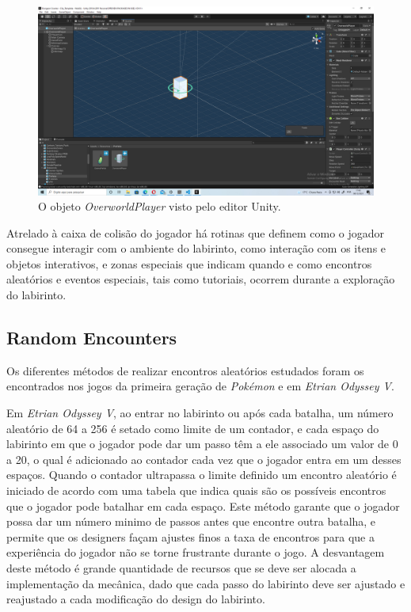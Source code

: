 \documentclass[
	12pt,				%
	openright,			%
	twoside,			%
	a4paper,			%
	english,			%
	french,				%
	spanish,			%
	brazil				%
	]{abntex2}
\begin{document}
\begin{figure}[h!]
 \centering
  \includegraphics[width=0.65\linewidth]{playerobject.jpg}
  \caption{O objeto \emph{OverworldPlayer} visto pelo editor Unity.}
  \label{fig:playerobject}
\end{figure}

Atrelado à caixa de colisão do jogador há rotinas que definem como o jogador consegue interagir com o ambiente do labirinto, como interação com os itens e objetos interativos, e zonas especiais que indicam quando e como encontros aleatórios e eventos especiais, tais como tutoriais, ocorrem durante a exploração do labirinto.

\subsection{Random Encounters}

Os diferentes métodos de realizar encontros aleatórios estudados foram os encontrados nos jogos da primeira geração de \emph{Pokémon} e em \emph{Etrian Odyssey V}.

Em \emph{Etrian Odyssey V}, ao entrar no labirinto ou após cada batalha, um número aleatório de 64 a 256 é setado como limite de um contador, e cada espaço do labirinto em que o jogador pode dar um passo têm a ele associado um valor de 0 a 20, o qual é adicionado ao contador cada vez que o jogador entra em um desses espaços. Quando o contador ultrapassa o limite definido um encontro aleatório é iniciado de acordo com uma tabela que indica quais são os possíveis encontros que o jogador pode batalhar em cada espaço. Este método garante que o jogador possa dar um número minimo de passos antes que encontre outra batalha, e permite que os designers façam ajustes finos a taxa de encontros para que a experiência do jogador não se torne frustrante durante o jogo. A desvantagem deste método é grande quantidade de recursos que se deve ser alocada a implementação da mecânica, dado que cada passo do labirinto deve ser ajustado e reajustado a cada modificação do design do labirinto.
\end{document}
